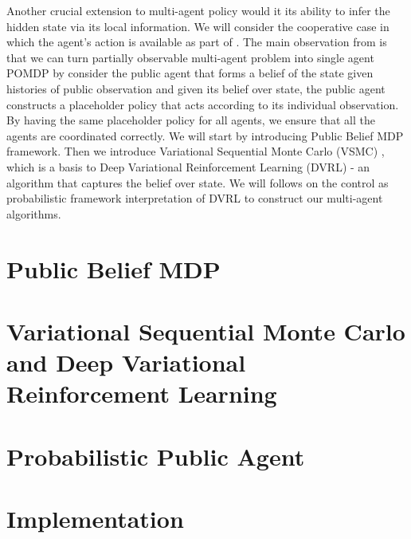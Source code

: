 \label{chapter:chap5}
\begin{miniabstract}
Another crucial extension to multi-agent policy would it its ability to infer the hidden state via its local information. We will consider the cooperative case in which the agent's action is available as part of . The main observation from \cite{nayyar2013decentralized, foerster2018bayesian} is that we can turn partially observable multi-agent problem into single agent POMDP by consider the public agent that forms a belief of the state given histories of public observation and given its belief over state, the public agent constructs a placeholder policy that acts according to its individual observation. By having the same placeholder policy for all agents, we ensure that all the agents are coordinated correctly. We will start by introducing Public Belief MDP framework. Then we introduce Variational Sequential Monte Carlo (VSMC) \cite{le2017auto, maddison2017filtering, naesseth2017variational}, which is a basis to Deep Variational Reinforcement Learning (DVRL) \cite{igl2018deep} - an algorithm that captures the belief over state. We will follows \cite{shvechikovjoint} on the control as probabilistic framework interpretation of DVRL to construct our multi-agent algorithms.
\end{miniabstract}

\section{Public Belief MDP}


\section{Variational Sequential Monte Carlo and Deep Variational Reinforcement Learning}


\section{Probabilistic Public Agent}


\section{Implementation}

